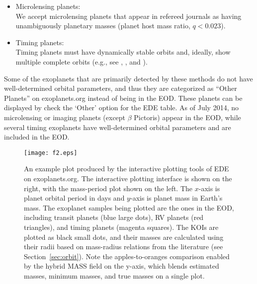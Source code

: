 \documentclass[11pt,preprint]{aastex}
\begin{document}
\begin{CJK*}{UTF8}{gbsn}
\begin{itemize}
\begin{enumerate}
\end{enumerate}
\item Microlensing planets:\\
  We accept microlensing planets that appear in refereed journals as
  having unambiguously planetary masses (planet host mass ratio,
  $q<0.023$). 

\item Timing planets:\\
  Timing planets must have dynamically stable orbits and, ideally, show
  multiple complete orbits (e.g., see \citealt{Wittenmyer2012},
  \citealt{Horner2012}, and \citealt{Wittenmyer2013}). 

\end{itemize}
Some of the exoplanets that are primarily detected by these methods do
not have well-determined orbital parameters, and thus they are
categorized as ``Other Planets'' on exoplanets.org instead of being in
the EOD. These planets can be displayed by check the `Other' option
for the EDE table. As of July 2014, no microlensing or imaging
planets (except $\beta$ Pictoris) appear in the EOD, while several timing exoplanets have
well-determined orbital parameters and are included in the
EOD.


\begin{figure}[!htb]
\centering
\texttt{[image: f2.eps]}
\caption{
  An example plot produced by the interactive plotting tools of
  EDE on exoplanets.org. The interactive plotting interface is shown
  on the right, with the mass-period plot shown on the left. The
  $x$-axis is planet orbital period in days and $y$-axis is planet
  mass in Earth's mass. The exoplanet samples being plotted are the
  ones in the EOD, including transit planets (blue large dots), RV
  planets (red triangles), and timing planets (magenta squares). The
  KOIs are plotted as black small dots, and their masses are
  calculated using their radii based on mass-radius relations from the
  literature (see Section~\ref{sec:orbit}).  Note the
  apples-to-oranges comparison enabled by the hybrid MASS field on the y-axis, which blends estimated
  masses, minimum masses, and true masses on a single plot.}
\label{fig:koi}
\end{figure}


\end{CJK*}
\end{document}
